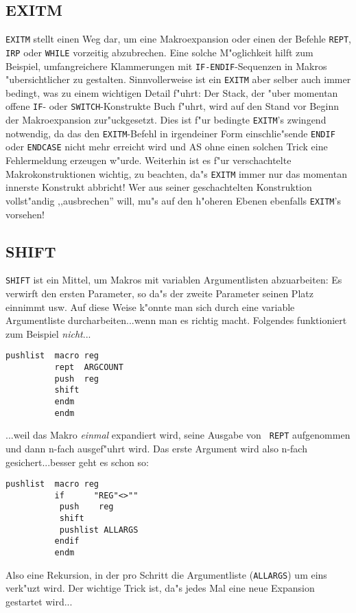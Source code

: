 \documentclass[12pt,a4paper,twoside]{report}
\makeatletter
\newcommand{\tty}[1]{{\tt #1}}
\newcommand{\ttindex}[1]{\index{#1@{\tt #1}}}
\makeatother
\begin{document}

\subsection{EXITM}
\ttindex{EXITM}

\tty{EXITM} stellt einen Weg dar, um eine Makroexpansion oder einen der
Befehle \tty{REPT}, \tty{IRP} oder \tty{WHILE} vorzeitig abzubrechen.
Eine solche M"oglichkeit hilft zum Beispiel, umfangreichere Klammerungen
mit \tty{IF-ENDIF}-Sequenzen in Makros "ubersichtlicher zu gestalten.
Sinnvollerweise ist ein \tty{EXITM} aber selber auch immer bedingt, was zu
einem wichtigen Detail f"uhrt: Der Stack, der "uber momentan offene
\tty{IF}- oder \tty{SWITCH}-Konstrukte Buch f"uhrt, wird auf den Stand vor
Beginn der Makroexpansion zur"uckgesetzt.  Dies ist f"ur bedingte
\tty{EXITM}'s zwingend notwendig, da das den \tty{EXITM}-Befehl in
irgendeiner Form einschlie"sende \tty{ENDIF} oder \tty{ENDCASE} nicht mehr
erreicht wird und AS ohne einen solchen Trick eine Fehlermeldung erzeugen
w"urde.  Weiterhin ist es f"ur verschachtelte Makrokonstruktionen
wichtig, zu beachten, da"s \tty{EXITM} immer nur das momentan innerste
Konstrukt abbricht!  Wer aus seiner geschachtelten Konstruktion
vollst"andig ,,ausbrechen'' will, mu"s auf den h"oheren Ebenen ebenfalls
\tty{EXITM}'s vorsehen!


\subsection{SHIFT}
\ttindex{SHIFT}

{\tt SHIFT} ist ein Mittel, um Makros mit variablen Argumentlisten
abzuarbeiten: Es verwirft den ersten Parameter, so da"s der zweite
Parameter seinen Platz einnimmt usw.  Auf diese Weise k"onnte man
sich durch eine variable Argumentliste durcharbeiten...wenn man es richtig
macht.  Folgendes funktioniert zum Beispiel {\em nicht}...
\begin{verbatim}
pushlist  macro reg
          rept  ARGCOUNT
          push  reg
          shift
          endm
          endm
\end{verbatim}
...weil das Makro {\em einmal} expandiert wird, seine Ausgabe von {\tt
REPT} aufgenommen und dann n-fach ausgef"uhrt wird.  Das erste Argument
wird also n-fach gesichert...besser geht es schon so:
\begin{verbatim}
pushlist  macro reg
          if      "REG"<>""
           push    reg
           shift
           pushlist ALLARGS
          endif
          endm
\end{verbatim}
Also eine Rekursion, in der pro Schritt die Argumentliste ({\tt ALLARGS})
um eins verk"uzt wird.  Der wichtige Trick ist, da"s jedes Mal eine neue
Expansion gestartet wird...
\end{document}
